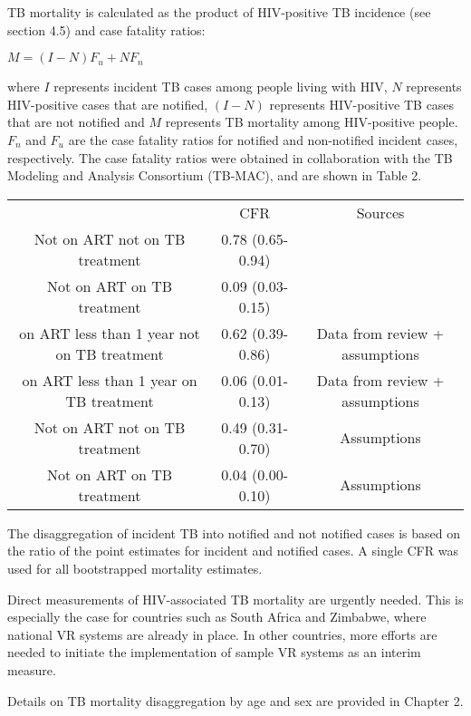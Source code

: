 TB mortality is calculated as the product of HIV-positive TB incidence (see section 4.5) and case fatality ratios:

$M = (I-N)F_u + NF_n$ 									

where $I$ represents incident TB cases among people living with HIV, $N$ represents HIV-positive cases that are notified, $(I-N)$ represents HIV-positive TB cases that are not notified and $M$ represents TB mortality among HIV-positive people. $F_n$ and $F_u$ are the case fatality ratios for notified and non-notified incident cases, respectively. The case fatality ratios were obtained in collaboration with the TB Modeling and Analysis Consortium (TB-MAC), and are shown in Table 2.

\begin{table} 
    \begin{tabular}{ c c c }
         & CFR & Sources \\ 
        Not on ART not on TB treatment & 0.78 (0.65-0.94) &  \cite{12742798} \\ 
        Not on ART on TB treatment & 0.09 (0.03-0.15) & \cite{21738585} \cite{11216921}\\ 
        on ART less than 1 year not on TB treatment & 0.62 (0.39-0.86) & Data from review + assumptions \\ 
        on ART less than 1 year on TB treatment &  0.06 (0.01-0.13) & Data from review + assumptions \\ 
        Not on ART not on TB treatment & 0.49 (0.31-0.70) & Assumptions \\ 
        Not on ART on TB treatment & 0.04 (0.00-0.10) & Assumptions \\ 
    \end{tabular} 
\end{table}

The disaggregation of incident TB into notified and not notified cases is based on the ratio of the point estimates for incident and notified cases. A single CFR was used for all bootstrapped mortality estimates.

Direct measurements of HIV-associated TB mortality are urgently needed. This is especially the case for countries such as South Africa and Zimbabwe, where national VR systems are already in place. In other countries, more efforts are needed to initiate the implementation of sample VR systems as an interim measure.

Details on TB mortality disaggregation by age and sex are provided in Chapter 2.
